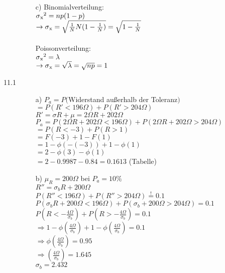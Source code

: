 \documentclass[a4paper]{article}
\begin{document}
\begin{description}
\begin{itemize}
			\item[c)] Binomialverteilung:\\ 
								$\sigma \textsubscript{x}\textsuperscript{2}= np(1-p)$\\
								$\rightarrow \sigma \textsubscript{x}= \sqrt{\frac{1}{N}N(1-\frac{1}{N})} = \sqrt{1-\frac{1}{N}}$\\
								\\
								Poissonverteilung:\\
								$\sigma \textsubscript{x}\textsuperscript{2}= \lambda$\\
								$\rightarrow \sigma \textsubscript{x}= \sqrt{\lambda} = \sqrt{np} = 1$\\
		\end{itemize}
	

\item[11.1] 
	\begin{itemize}
		\item[a)]	$P_a= P($Widerstand außerhalb der Toleranz$)$\\
							$=P(R'<196\Omega) + P(R'>204\Omega)$\\
							$R'= \sigma R + \mu = 2\Omega R + 202\Omega$\\
						
							$P_a= P(2\Omega R + 202\Omega < 196\Omega) + P(2\Omega R + 202\Omega > 204\Omega)$\\
							$=P(R < -3) + P(R > 1)$\\
							$=F(-3) + 1-F(1)$\\
							$=1-\phi(-(-3))+1-\phi (1)$\\
							$=2-\phi (3) -\phi(1)$\\
							$=2-0.9987-0.84=0.1613$ (Tabelle)\\
\newpage
		\item[b)] $\mu_R=200\Omega$ bei $P_a= 10\%$\\
							$R''=\sigma_b R+200\Omega$\\
							
							$P(R''< 196\Omega) + P(R'' > 204\Omega) \stackrel{!}{=}0.1$\\
							$P(\sigma_b R +200\Omega <196\Omega) + P(\sigma_b +200\Omega > 204\Omega) =0.1$\\
							$P(R< -\frac{4\Omega}{\sigma_b}) + P(R> -\frac{4\Omega}{\sigma_b})=0.1$\\
							$\Rightarrow 1-\phi (\frac{4\Omega}{\sigma_b}) + 1 -\phi (\frac{4\Omega}{\sigma_b})=0.1$\\
							$\Rightarrow \phi (\frac{4\Omega}{\sigma_b}) =0.95$\\
							$\Rightarrow (\frac{4\Omega}{\sigma_b})=1.645$\\
							$\sigma_b = 2.432$\\
							

\end{itemize}
\end{description}
\end{document}
